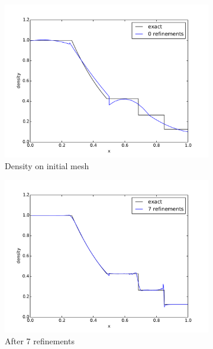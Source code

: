 \documentclass[preprint,12pt]{elsarticle}
\begin{document}
\begin{figure}[p]
\centering
\begin{subfigure}[c]{0.3\textwidth}
\centering
\includegraphics[width=\textwidth]{SpaceTimeCNS/Sod1e-5/den1.pdf}
\caption{Density on initial mesh}
\label{fig:sod_den0}
\end{subfigure}
\begin{subfigure}[c]{0.3\textwidth}
\centering
\includegraphics[width=\textwidth]{SpaceTimeCNS/Sod1e-5/den8.pdf}
\caption{After 7 refinements}
\label{fig:sod_den7}
\end{subfigure}
\begin{subfigure}[c]{0.3\textwidth}
\centering

\end{subfigure}
\end{figure}
\end{document}
